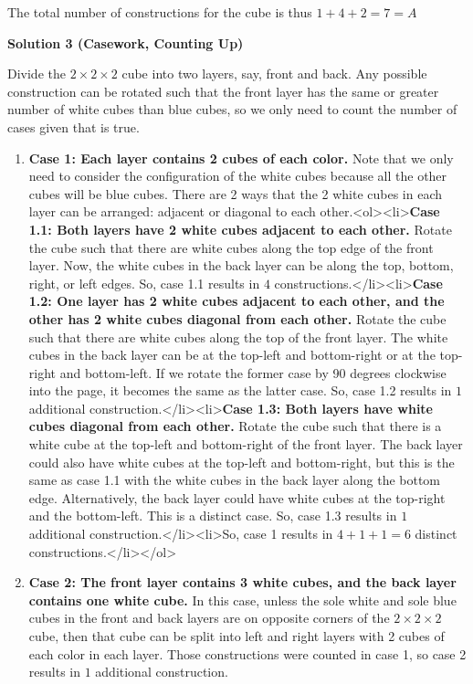 \begin{enumerate}
 The total number of constructions for the cube is thus $1+4+2=7=\boxed{A}$




\textbf{Solution 3 (Casework, Counting Up)}

Divide the $2 \times 2 \times 2$ cube into two layers, say, front and back. Any possible construction can be rotated such that the front layer has the same or greater number of white cubes than blue cubes, so we only need to count the number of cases given that is true.  

 
            \begin{enumerate}
        \item \textbf{Case 1: Each layer contains 2 cubes of each color.} Note that we only need to consider the configuration of the white cubes because all the other cubes will be blue cubes. There are 2 ways that the 2 white cubes in each layer can be arranged: adjacent or diagonal to each other.<ol><li>\textbf{Case 1.1: Both layers have 2 white cubes adjacent to each other.} Rotate the cube such that there are white cubes along the top edge of the front layer. Now, the white cubes in the back layer can be along the top, bottom, right, or left edges. So, case 1.1 results in $4$ constructions.</li><li>\textbf{Case 1.2: One layer has 2 white cubes adjacent to each other, and the other has 2 white cubes diagonal from each other.} Rotate the cube such that there are white cubes along the top of the front layer. The white cubes in the back layer can be at the top-left and bottom-right or at the top-right and bottom-left. If we rotate the former case by 90 degrees clockwise into the page, it becomes the same as the latter case. So, case 1.2 results in $1$ additional construction.</li><li>\textbf{Case 1.3: Both layers have white cubes diagonal from each other.} Rotate the cube such that there is a white cube at the top-left and bottom-right of the front layer. The back layer could also have white cubes at the top-left and bottom-right, but this is the same as case 1.1 with the white cubes in the back layer along the bottom edge. Alternatively, the back layer could have white cubes at the top-right and the bottom-left. This is a distinct case. So, case 1.3 results in $1$ additional construction.</li><li>So, case 1 results in $4+1+1=6$ distinct constructions.</li></ol>
        \item \textbf{Case 2: The front layer contains 3 white cubes, and the back layer contains one white cube.} In this case, unless the sole white and sole blue cubes in the front and back layers are on opposite corners of the $2 \times 2 \times 2$ cube, then that cube can be split into left and right layers with 2 cubes of each color in each layer. Those constructions were counted in case 1, so case 2 results in $1$ additional construction.

\end{enumerate}
\end{enumerate}
